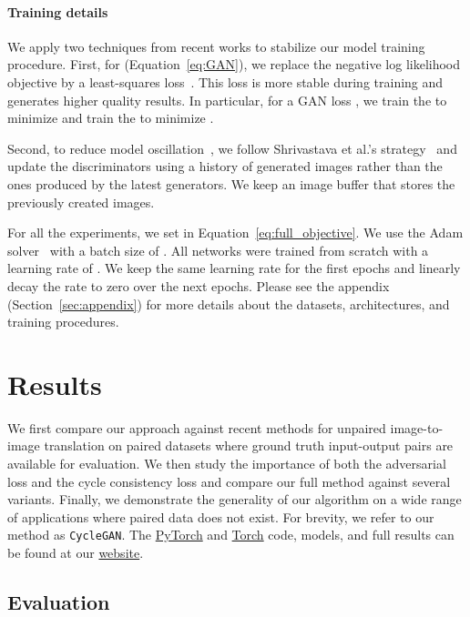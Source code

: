 \documentclass[10pt,twocolumn,letterpaper]{article}
\newcommand{\refsec}[1]{Section~\ref{sec:#1}}
\newcommand{\refeq}[1]{Equation~\ref{eq:#1}}
\newcommand{\lblsec}[1]{\label{sec:#1}}
\begin{document}
\paragraph{Training details}
We apply two techniques from recent works to stabilize our model training procedure. First, for  (\refeq{GAN}), we replace the negative log likelihood objective by a least-squares loss~\cite{mao2017least}. This loss is more stable during training and generates higher quality results. In particular, for a GAN loss , we train the  to minimize  and train the  to minimize .

Second, to reduce model oscillation~\cite{goodfellow2016nips}, we follow Shrivastava et al.'s strategy~\cite{shrivastava2016learning} and update the discriminators using a history of generated images rather than the ones produced by the
latest generators. We keep an image buffer that stores the  previously created images. 


For all the experiments, we set  in \refeq{full_objective}.
We use the Adam solver~\cite{kingma2014adam} with a batch size of . All networks were trained from scratch with a learning rate of . We keep the same learning rate for the first  epochs and linearly decay the rate to zero over the next  epochs.
Please see the appendix (\refsec{appendix}) for more details about the datasets, architectures, and training procedures.
 \section{Results}
\lblsec{results}
We first compare our approach against recent methods for unpaired image-to-image translation on paired datasets where ground truth input-output pairs are available for evaluation. We then study the importance of both the adversarial loss and the cycle consistency loss and compare our full method against several variants. Finally, we demonstrate the generality of our algorithm on a wide range of applications where paired data does not exist. For brevity, we refer to our method as {\tt CycleGAN}. The \href{https://github.com/junyanz/pytorch-CycleGAN-and-pix2pix}{PyTorch} and \href{https://github.com/junyanz/CycleGAN}{Torch} code, models, and full results can be found at our \href{https://junyanz.github.io/CycleGAN/}{website}.



\subsection{Evaluation}
\lblsec{comparison}
\end{document}
